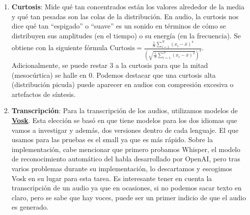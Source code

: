 \begin{enumerate}
	\item \textbf{Curtosis}: Mide qué tan concentrados están los valores alrededor de la media y qué tan pesadas son las colas de la distribución. En audio, la curtosis nos dice qué tan ``espigado'' o ``suave'' es un sonido en términos de cómo se distribuyen sus amplitudes (en el tiempo) o su energía (en la frecuencia). Se obtiene con la siguiente fórmula $\text{Curtosis} = \frac{\frac{1}{N}\sum_{i=1}^N (x_i - \bar{x})^4}{\left(\sqrt{\frac{1}{N}\sum_{i=1}^N (x_i - \bar{x})^2}\right)^4}$. Adicionalmente, se puede restar 3 a la curtosis para que la mitad (mesocúrtica) se halle en 0. Podemos destacar que una curtosis alta (distribución picuda) puede aparecer en audios con compresión excesiva o artefactos de síntesis.
	\item \textbf{Transcripción}: Para la transcripción de los audios, utilizamos modelos de \href{https://alphacephei.com/vosk/models}{\textbf{Vosk}}. Esta elección se basó en que tiene modelos para los dos idiomas que vamos a investigar y además, dos versiones dentro de cada lenguaje. El que usamos para las pruebas es el small ya que es más rápido. Sobre la implementación, cabe mencionar que primero probamos Whisper, el modelo de reconocimiento automático del habla desarrollado por OpenAI, pero tras varios problemas durante su implementación, lo descartamos y escogimos Vosk en su lugar para esta tarea. Es interesante tener en cuenta la transcripción de un audio ya que en ocasiones, si no podemos sacar texto en claro, pero se sabe que hay voces, puede ser un primer indicio de que el audio es generado.
\end{enumerate}
